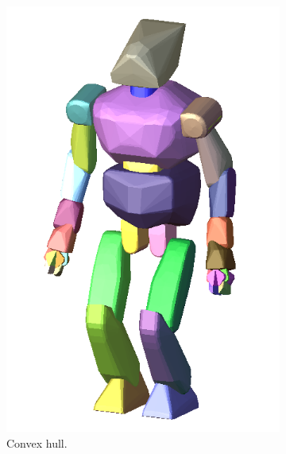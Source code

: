 \begin{figure}
\begin{subfigure}{0.24\columnwidth}
    \includegraphics[width = \columnwidth]
                    {src/chap3-optimal-motion-planning/figure/hrp2-convex-hull.png}
    \caption{Convex hull.}
    \label{simple-path-sola}
  \end{subfigure}
  \begin{subfigure}{0.24\columnwidth}
    \centering

\end{subfigure}
\end{figure}
